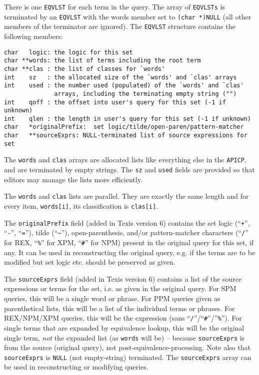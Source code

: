 There is one \verb`EQVLST` for each term in the query.  The array of
\verb`EQVLSTs` is terminated by an \verb`EQVLST` with the words member set to
\verb`(char *)NULL` (all other members of the terminator are ignored).
The \verb`EQVLST` structure contains the following members:

\begin{verbatim}
char   logic: the logic for this set
char **words: the list of terms including the root term
char **clas : the list of classes for `words'
int    sz   : the allocated size of the `words' and `clas' arrays
int    used : the number used (populated) of the `words' and `clas'
              arrays, including the terminating empty string ("")
int    qoff : the offset into user's query for this set (-1 if unknown)
int    qlen : the length in user's query for this set (-1 if unknown)
char   *originalPrefix:  set logic/tilde/open-paren/pattern-matcher
char   **sourceExprs: NULL-terminated list of source expressions for set
\end{verbatim}

The \verb`words` and \verb`clas` arrays are allocated lists like
everything else in the \verb`APICP`, and are terminated by empty
strings.  The \verb`sz` and \verb`used` fields are provided so that
editors may manage the lists more efficiently.

The \verb`words` and \verb`clas` lists are parallel.  They are exactly
the same length and for every item, \verb`words[i]`, its classification
is \verb`clas[i]`.

The \verb`originalPrefix` field (added in Texis version 6) contains
the set logic (``\verb`+`'', ``\verb`-`'', ``\verb`=`''), tilde
(``\verb`~`''), open-parenthesis, and/or pattern-matcher characters
(``\verb`/`'' for REX, ``\verb`%`'' for XPM, ``\verb`#`'' for NPM)
present in the original query for this set, if any.  It can be used in
reconstructing the original query, e.g. if the terms are to be
modified but set logic etc. should be preserved as given.

The \verb`sourceExprs` field (added in Texis version 6) contains a
list of the source expressions or terms for the set, i.e. as given in
the original query.  For SPM queries, this will be a single word or
phrase.  For PPM queries given as parenthetical lists, this will be a
list of the individual terms or phrases.  For REX/NPM/XPM queries,
this will be the expression (sans ``\verb`/`''/``\verb`#`''/''\verb`%`'').
For single terms that are expanded by equivalence lookup, this will be
the original single term, {\em not} the expanded list (as \verb`words`
will be) -- because \verb`sourceExprs` is from the source (original
query), not post-equivalence-processing.  Note also that
\verb`sourceExprs` is \verb`NULL` (not empty-string) terminated.
The \verb`sourceExprs` array can be used in reconstructing or
modifying queries.


